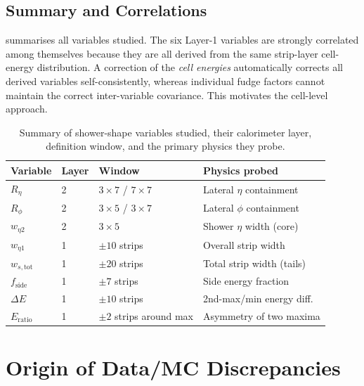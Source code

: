 \documentclass[11pt,a4paper]{article}
\newcommand{\Reta}{R_{\eta}}
\newcommand{\Rphi}{R_{\phi}}
\newcommand{\weta}{w_{\eta 2}}
\newcommand{\wetaone}{w_{\eta 1}}
\newcommand{\wstot}{w_{s,\mathrm{tot}}}
\newcommand{\fside}{f_{\mathrm{side}}}
\newcommand{\dE}{\Delta E}
\newcommand{\Eratio}{E_{\mathrm{ratio}}}
\begin{document}
\subsection{Summary and Correlations}
\label{sec:variables:correlations}

 summarises all variables studied.  The six
Layer-1 variables are strongly correlated among themselves because
they are all derived from the same strip-layer cell-energy
distribution.  A correction of the \emph{cell energies} automatically
corrects all derived variables self-consistently, whereas individual
fudge factors cannot maintain the correct inter-variable covariance.
This motivates the cell-level approach.

\begin{table}[htbp]
  \centering
  \caption{Summary of shower-shape variables studied, their calorimeter
           layer, definition window, and the primary physics they probe.}
  \label{tab:variables}
  \begin{tabular}{lllp{5.5cm}}
    \toprule
    Variable & Layer & Window & Physics probed \\
    \midrule
    $\Reta$    & 2 & $3\times 7$ / $7\times 7$ & Lateral $\eta$ containment\\
    $\Rphi$    & 2 & $3\times 5$ / $3\times 7$ & Lateral $\phi$ containment\\
    $\weta$    & 2 & $3\times 5$               & Shower $\eta$ width (core)\\
    \midrule
    $\wetaone$ & 1 & $\pm 10$ strips           & Overall strip width\\
    $\wstot$   & 1 & $\pm 20$ strips           & Total strip width (tails)\\
    $\fside$   & 1 & $\pm 7$ strips            & Side energy fraction\\
    $\dE$      & 1 & $\pm 10$ strips           & 2nd-max/min energy diff.\\
    $\Eratio$  & 1 & $\pm 2$ strips around max & Asymmetry of two maxima\\
    \bottomrule
  \end{tabular}
\end{table}

\section{Origin of Data/MC Discrepancies}
\label{sec:discrepancy}
\end{document}
